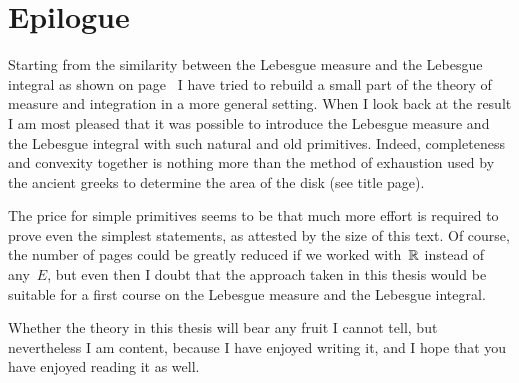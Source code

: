 \documentclass[main.tex]{subfiles}
\begin{document}
\section{Epilogue}
\noindent
Starting from the similarity
between
 the Lebesgue measure
and the Lebesgue integral
as shown  on page~\pageref{S:intro}
I have tried to 
rebuild
a small part of the theory of
measure and integration 
in a more general setting.
When I look back at the result
I am most pleased that it was possible
to introduce the Lebesgue measure and the Lebesgue integral
with such natural and old primitives.
Indeed,
completeness and convexity
together
is nothing more than
the method of exhaustion
used by the ancient greeks 
to determine the area of the disk (see title page).

The price for simple primitives
seems to be that much more effort is
required to prove even the simplest statements,
as attested by the size of this text.
Of course,
the number of pages could be
greatly reduced if we worked with~$\mathbb{R}$
instead of any~$E$,
but even then
I doubt that the approach taken
in this thesis would
be suitable
for a first course on the Lebesgue measure
and the Lebesgue integral.

Whether the theory in this thesis
will bear any fruit
I cannot tell,
but nevertheless I am content,
because I have enjoyed writing it,
and I hope that you have enjoyed reading it as well.
\label{S:conclusion}
\end{document}
